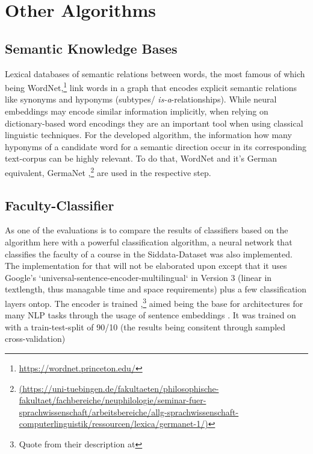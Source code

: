 \section{Other Algorithms}

\subsection{Semantic Knowledge Bases}

Lexical databases of semantic relations between words, the most famous of which being WordNet,\footnote{\url{https://wordnet.princeton.edu/}} link words in a graph that encodes explicit semantic relations like synonyms and hyponyms (subtypes/ \emph{is-a}-relationships). While neural %
embeddings may encode similar information implicitly, when relying on dictionary-based word encodings they are an important tool when using classical linguistic techniques. For the developed algorithm, the information how many hyponyms of a candidate word for a semantic direction %
occur in its corresponding text-corpus can be highly relevant. To do that, WordNet \cite{Miller1995} and it's German equivalent, GermaNet \cite{hamp-feldweg-1997-germanet,Henrich},\footnote{\url{(https://uni-tuebingen.de/fakultaeten/philosophische-fakultaet/fachbereiche/neuphilologie/seminar-fuer-sprachwissenschaft/arbeitsbereiche/allg-sprachwissenschaft-computerlinguistik/ressourcen/lexica/germanet-1/)}} are used in the respective step.


\subsection{Faculty-Classifier}
\label{sec:faculty_classifier}

As one of the evaluations is to compare the results of classifiers based on the algorithm here with a powerful classification algorithm, a neural network that classifies the faculty of a course in the Siddata-Dataset was also implemented. The implementation for that will not be elaborated upon except %
that it uses Google's `universal-sentence-encoder-multilingual` in Version 3 (linear in textlength, thus managable time and space requirements) plus a few classification layers ontop. The encoder is trained ,\footnote{Quote from their description at   } aimed being the base for architectures for many NLP tasks through the usage of sentence embeddings \cite{Guo}. It was trained on with a train-test-split of 90/10 (the results being consitent through sampled cross-validation)


